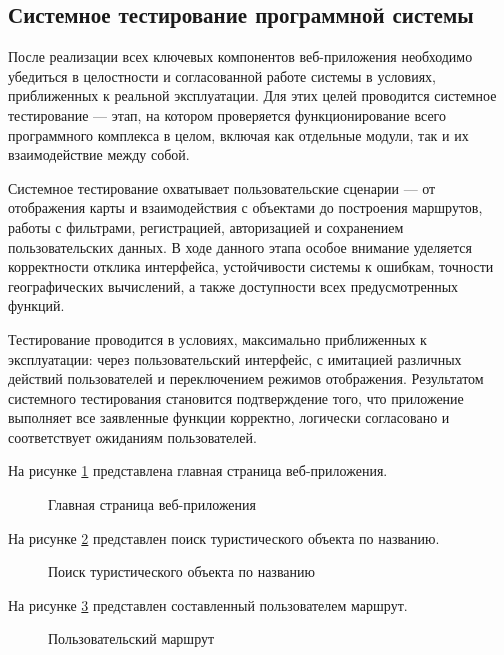 \subsection{Системное тестирование программной системы}

После реализации всех ключевых компонентов веб-приложения необходимо убедиться в целостности и согласованной работе системы в условиях, приближенных к реальной эксплуатации. Для этих целей проводится системное тестирование — этап, на котором проверяется функционирование всего программного комплекса в целом, включая как отдельные модули, так и их взаимодействие между собой.

Системное тестирование охватывает пользовательские сценарии — от отображения карты и взаимодействия с объектами до построения маршрутов, работы с фильтрами, регистрацией, авторизацией и сохранением пользовательских данных. В ходе данного этапа особое внимание уделяется корректности отклика интерфейса, устойчивости системы к ошибкам, точности географических вычислений, а также доступности всех предусмотренных функций.

Тестирование проводится в условиях, максимально приближенных к эксплуатации: через пользовательский интерфейс, с имитацией различных действий пользователей и переключением режимов отображения. Результатом системного тестирования становится подтверждение того, что приложение выполняет все заявленные функции корректно, логически согласовано и соответствует ожиданиям пользователей.

На рисунке \ref{r1:image} представлена главная страница веб-приложения.

\begin{figure}[H] %
\center{\texttt{[image: r1]}}
\caption{Главная страница веб-приложения}
\label{r1:image}
\end{figure}

\newpage
На рисунке \ref{r2:image} представлен поиск туристического объекта по названию.

\begin{figure}[H]
\center{\texttt{[image: r2]}}
\caption{Поиск туристического объекта по названию}
\label{r2:image}
\end{figure}

\newpage
На рисунке \ref{r3:image} представлен составленный пользователем маршрут.

\begin{figure}[H]
\center{\texttt{[image: r3]}}
\caption{Пользовательский маршрут}
\label{r3:image}
\end{figure}

